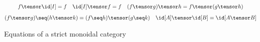 \begin{figure}
    \begin{gather*}
        f \tensor \id[I] = f
        \quad
        \id[I] \tensor f = f
        \quad
        (f \tensor g) \tensor h = f \tensor (g \tensor h)
        \\[0.5em]
        (f \tensor g) \seq (h \tensor k) = (f \seq h) \tensor (g \seq k)
        \quad
        \id[A] \tensor \id[B] = \id[A \tensor B]
    \end{gather*}
    \caption{
        Equations of a strict monoidal category
    }
    \label{fig:mc-equations}
\end{figure}